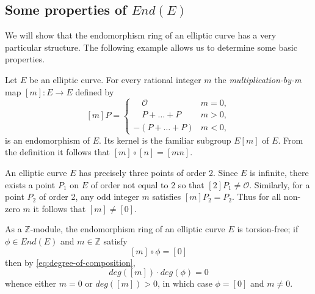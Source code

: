 \subsection{Some properties of $End(E)$}
\label{sec:some-properties-ende}

We will show that the endomorphism ring of an elliptic curve has a very particular
structure.  The following example allows us to determine some basic properties.

\begin{example}
  \label{ex:mult-by-m}
  Let $E$ be an elliptic curve.  For every rational integer $m$ the
  \emph{multiplication-by-m} map $\left[m\right] \colon E \rightarrow E$ defined by
  \begin{equation*}
    \left[ m \right] P =
    \begin{cases}
      \quad \mathcal{O} & m = 0,\\
      \quad P + \ldots + P & m > 0,\\
      - \left( P + \ldots + P \right) & m < 0,
    \end{cases}
  \end{equation*}
  is an endomorphism of $E$.  Its kernel is the familiar subgroup $E \left[ m
  \right]$ of $E$.  From the definition it follows that $\left[m\right] \circ
  \left[n\right] = \left[mn\right]$.
\end{example}

An elliptic curve $E$ has precisely three points of order 2.  Since $E$ is infinite,
there exists a point $P_{1}$ on $E$ of order not equal to 2 so that
$\left[2\right]P_{1} \neq \mathcal{O}$.  Similarly, for a point $P_{2}$ of order 2, any odd
integer $m$ satisfies $\left[m\right]P_{2} = P_{2}$.  Thus for all non-zero $m$ it
follows that $\left[m\right] \neq \left[0\right]$.

As a $\mathbb{Z}$-module, the endomorphism ring of an elliptic curve $E$ is
torsion-free; if $\phi \in End(E)$ and $m \in \mathbb{Z}$ satisfy
\begin{equation*}
  \left[m\right] \circ \phi = \left[ 0 \right]
\end{equation*}
then by \eqref{eq:degree-of-composition},
\begin{equation*}
  deg \left(\left[m\right]\right) \cdot deg \left( \phi \right) = 0
\end{equation*}
whence either $m = 0$ or $deg\left(\left[m\right]\right) > 0$, in which case $\phi =
\left[0\right]$ and $m \neq 0$.

